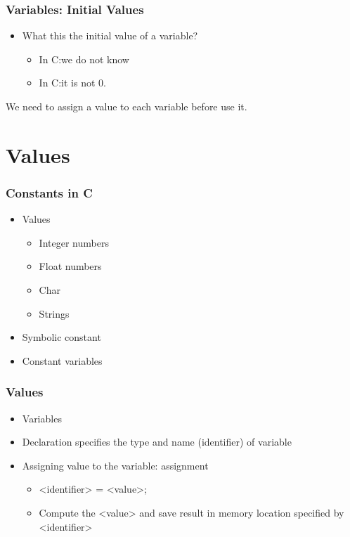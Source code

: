 \documentclass{../c-lecture}
\begin{document}
\begin{frame}
  \frametitle{Variables: Initial Values}
  \begin{itemize}
    \item What this the initial value of a variable?
    \begin{itemize}
      \item In C:\@ we do not know
      \item In C:\@ it is not 0.
    \end{itemize}
  \end{itemize}
  \begin{block}{}
  We need to assign a value to each variable before use it.
  \end{block}
\end{frame}

\section{Values}

\begin{frame}
  \frametitle{Constants in C}
  \begin{itemize}
    \item Values
    \begin{itemize}
      \item Integer numbers
      \item Float numbers
      \item Char
      \item Strings
    \end{itemize}
    \item Symbolic constant
    \item Constant variables
  \end{itemize}
\end{frame}

\begin{frame}
  \frametitle{Values}
  \begin{itemize}
    \item Variables
    \item Declaration specifies the type and name (identifier) of variable
    \item
      Assigning value to the variable:
      {\color{Orange} assignment}

    \begin{itemize}
      \item <identifier> = <value>;
      \item
        Compute the <value> and save result in memory location specified
        by <identifier>

    \end{itemize}
  \end{itemize}
\end{frame}
\end{document}
